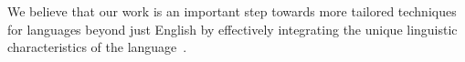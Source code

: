 

We believe that our work is an important step towards more tailored techniques for languages beyond just English by effectively integrating the unique linguistic characteristics of the language~\cite[\#BenderRule]{BenderRule}. 

